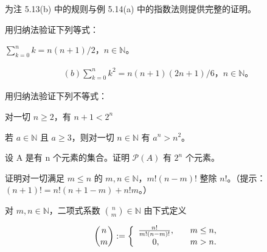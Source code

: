 \begin{exercises}
\item

为注 5.13(b) 中的规则与例 5.14(a) 中的指数法则提供完整的证明。

\item

用归纳法验证下列等式：

\begin{items}
\item

$ \sum_{k=0}^{n} k = n (n + 1) / 2 $，$ n \in \mathbb{N} $。

\begin{equation*}
\begin{array}{r}{(b)  \sum_{k=0}^{n} k^{2} = n (n + 1) (2n + 1) / 6 ， n \in \mathbb{N} 。}\end{array}
\end{equation*}
\end{items}

\item

用归纳法验证下列不等式：

\begin{items}
\item

对一切 $ n \geq 2 $，有 $ n + 1 < 2^n $

\item

若 $ a \in \mathbb{N} $ 且 $ a \geq 3 $，则对一切 $ n \in \mathbb{N} $ 有 $ a^n > n^2 $。

\end{items}

\item

设 A 是有 n 个元素的集合。证明 $ \mathcal{P}(A) $ 有 $ 2^{n} $ 个元素。

\item

\begin{items}
\item

证明对一切满足 $ m \leq n $ 的 $ m, n \in \mathbb{N} $，$ m!(n-m)! $ 整除 $ n! $。（提示：$ (n+1)!=n!(n+1-m)+n!m $。）

\item

对 $ m, n \in \mathbb{N} $，二项式系数 $ \binom{n}{m} \in \mathbb{N} $ 由下式定义

\begin{equation*}
{n \choose m}:=\left\{\begin{array}{c l}{\frac{n!}{m!(n-m)!},}&{\quad m\leq n,}\\ {0,}&{\quad m>n.}\\ \end{array}\right.
\end{equation*}


\end{items}
\end{exercises}
